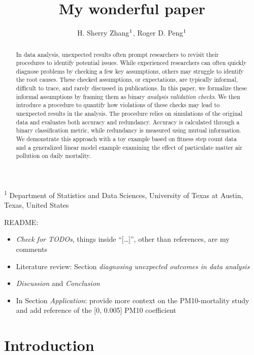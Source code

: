 \documentclass[
  12pt,
]{interact}
\title{My wonderful paper}
\author{H. Sherry Zhang$\textsuperscript{1}$, Roger D.
Peng$\textsuperscript{1}$}
\providecommand{\tightlist}{%
  \setlength{\itemsep}{0pt}\setlength{\parskip}{0pt}}\usepackage{longtable,booktabs,array}
\begin{document}
\captionsetup{labelsep=space}
\maketitle
\textsuperscript{1} Department of Statistics and Data
Sciences, University of Texas at Austin, Texas, United States
\begin{abstract}
In data analysis, unexpected results often prompt researchers to revisit
their procedures to identify potential issues. While experienced
researchers can often quickly diagnose problems by checking a few key
assumptions, others may struggle to identify the root causes. These
checked assumptions, or expectations, are typically informal, difficult
to trace, and rarely discussed in publications. In this paper, we
formalize these informal assumptions by framing them as binary
\emph{analysis validation checks}. We then introduce a procedure to
quantify how violations of these checks may lead to unexpected results
in the analysis. The procedure relies on simulations of the original
data and evaluates both accuracy and redundancy. Accuracy is calculated
through a binary classification metric, while redundancy is measured
using mutual information. We demonstrate this approach with a toy
example based on fitness step count data and a generalized linear model
example examining the effect of particulate matter air pollution on
daily mortality.
\end{abstract}


README:

\begin{itemize}
\tightlist
\item
  \emph{Check for TODOs}, things inside ``{[}\ldots{]}'', other than
  references, are my comments
\item
  Literature review: Section \emph{diagnosing unexpected outcomes in
  data analysis}
\item
  \emph{Discussion} and \emph{Conclusion}
\item
  In Section \emph{Application}: provide more context on the
  PM10-mortality study and add reference of the {[}0, 0.005{]} PM10
  coefficient
\end{itemize}

\newpage

\section{Introduction}\label{introduction}
\end{document}
